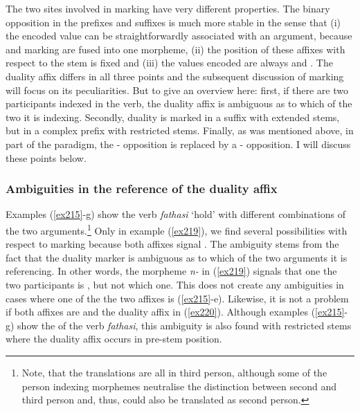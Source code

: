The two sites involved in  marking have very different properties. The binary opposition in the  prefixes and suffixes is much more stable in the sense that (i) the encoded value can be straightforwardly associated with an argument, because  and  marking are fused into one morpheme, (ii) the position of these affixes with respect to the stem is fixed and (iii) the values encoded are always \Sg{} and \Nsg{}. The duality affix differs in all three points and the subsequent discussion of  marking will focus on its peculiarities. But to give an overview here: first, if there are two participants indexed in the verb, the duality affix is ambiguous as to which of the two it is indexing. Secondly, duality is marked in a suffix with extended stems, but in a complex  prefix with restricted stems. Finally, as was mentioned above, in part of the paradigm, the \Du{}-\Ndu{} opposition is replaced by a \Pl{}-\Npl{} opposition. I will discuss these points below.

\subsubsection{Ambiguities in the reference of the duality affix} \label{ambiguitiesdualref}

Examples (\ref{ex215}-g) show the verb \emph{fathasi} `hold' with different  combinations of the two arguments.\footnote{Note, that the  translations are all in third person, although some of the person indexing morphemes neutralise the distinction between second and third person and, thus, could also be translated as second person.} Only in example (\ref{ex219}), we find several possibilities with respect to  marking because both  affixes signal . The ambiguity stems from the fact that the duality marker is ambiguous as to which of the two arguments it is referencing. In other words, the  morpheme \emph{n-} in (\ref{ex219}) signals that one the two participants is , but not which one. This does not create any ambiguities in cases where one of the the two  affixes is  (\ref{ex215}-e). Likewise, it is not a problem if both  affixes are  and the duality affix in  (\ref{ex220}). Although examples (\ref{ex215}-g) show the  of the verb \emph{fathasi}, this ambiguity is also found with restricted stems where the duality affix occurs in pre-stem position.

